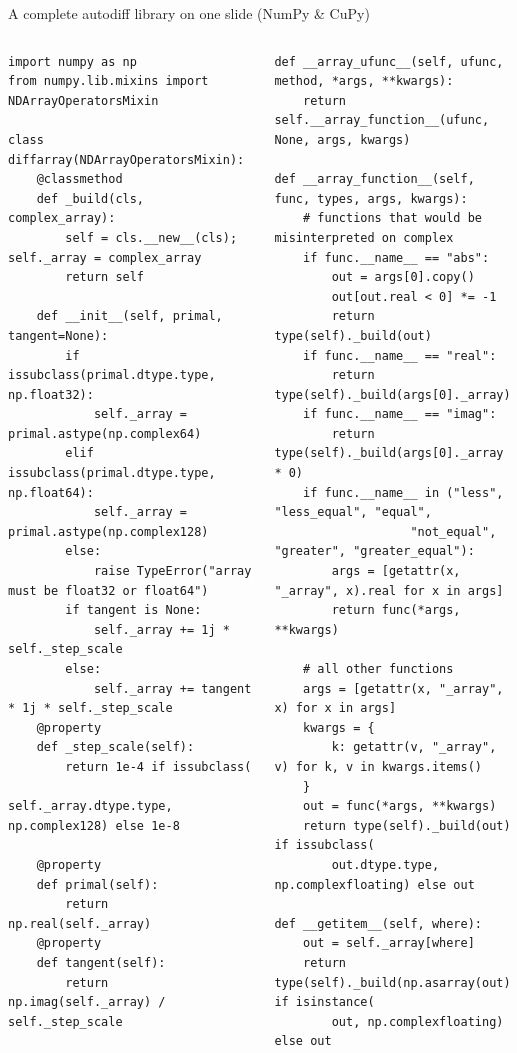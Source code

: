 \documentclass[aspectratio=169]{beamer}
\begin{document}
\begin{frame}[fragile]{A complete autodiff library on one slide (NumPy \& CuPy)}
\vspace{0.1 cm}
\tiny
\begin{columns}
\begin{verbatim}
import numpy as np
from numpy.lib.mixins import NDArrayOperatorsMixin

class diffarray(NDArrayOperatorsMixin):
    @classmethod
    def _build(cls, complex_array):
        self = cls.__new__(cls); self._array = complex_array
        return self

    def __init__(self, primal, tangent=None):
        if issubclass(primal.dtype.type, np.float32):
            self._array = primal.astype(np.complex64)
        elif issubclass(primal.dtype.type, np.float64):
            self._array = primal.astype(np.complex128)
        else:
            raise TypeError("array must be float32 or float64")
        if tangent is None:
            self._array += 1j * self._step_scale
        else:
            self._array += tangent * 1j * self._step_scale
    @property
    def _step_scale(self):
        return 1e-4 if issubclass(
            self._array.dtype.type, np.complex128) else 1e-8

    @property
    def primal(self):
        return np.real(self._array)
    @property
    def tangent(self):
        return np.imag(self._array) / self._step_scale
\end{verbatim}

\begin{verbatim}
def __array_ufunc__(self, ufunc, method, *args, **kwargs):
    return self.__array_function__(ufunc, None, args, kwargs)

def __array_function__(self, func, types, args, kwargs):
    # functions that would be misinterpreted on complex
    if func.__name__ == "abs":
        out = args[0].copy()
        out[out.real < 0] *= -1
        return type(self)._build(out)
    if func.__name__ == "real":
        return type(self)._build(args[0]._array)
    if func.__name__ == "imag":
        return type(self)._build(args[0]._array * 0)
    if func.__name__ in ("less", "less_equal", "equal",
                   "not_equal", "greater", "greater_equal"):
        args = [getattr(x, "_array", x).real for x in args]
        return func(*args, **kwargs)

    # all other functions
    args = [getattr(x, "_array", x) for x in args]
    kwargs = {
        k: getattr(v, "_array", v) for k, v in kwargs.items()
    }
    out = func(*args, **kwargs)
    return type(self)._build(out) if issubclass(
        out.dtype.type, np.complexfloating) else out

def __getitem__(self, where):
    out = self._array[where]
    return type(self)._build(np.asarray(out)) if isinstance(
        out, np.complexfloating) else out
\end{verbatim}
\end{columns}
\end{frame}
\end{document}
